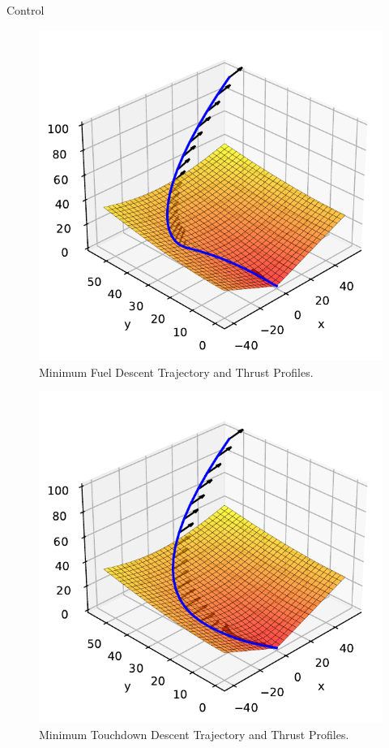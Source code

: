 \begin{chapter}{Control}
    \begin{figure}[htbp]
        \centering
        \includegraphics[width=\linewidth]{examples/364a/rocket_min_fuel.pdf}
        \caption{Minimum Fuel Descent Trajectory and Thrust Profiles.}
        \label{fig:364a-min-fuel-desc}
    \end{figure}


    \begin{figure}[htbp]
        \centering
        \includegraphics[width=\linewidth]{examples/364a/rocket_min_descent.pdf}
        \caption{Minimum Touchdown Descent Trajectory and Thrust Profiles.}
        \label{fig:364a-min-touchdown-desc}
    \end{figure}


\end{chapter}

